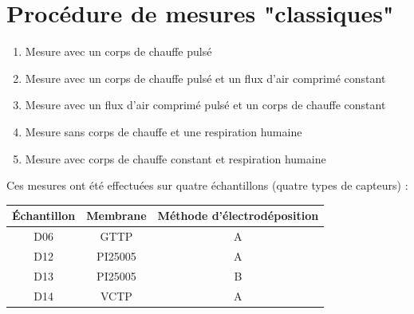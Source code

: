\section{Procédure de mesures "classiques"}
\begin{enumerate}
    \item Mesure avec un corps de chauffe pulsé\\
    \item Mesure avec un corps de chauffe pulsé et un flux d'air comprimé constant\\
    \item Mesure avec un flux d'air comprimé pulsé et un corps de chauffe constant\\
    \item Mesure sans corps de chauffe et une respiration humaine\\
    \item Mesure avec corps de chauffe constant et respiration humaine
\end{enumerate}

Ces mesures ont été effectuées sur quatre échantillons (quatre types de capteurs) :
\begin{table}[H]
    \centering
    \begin{tabular}{|c|c|c|}
        \hline
        Échantillon & Membrane & Méthode d'électrodéposition \\
        \hline
        D06         & GTTP     & A                           \\
        \hline
        D12         & PI25005  & A                           \\
        \hline
        D13         & PI25005  & B                           \\
        \hline
        D14         & VCTP     & A                           \\
        \hline
    \end{tabular}
\end{table}


